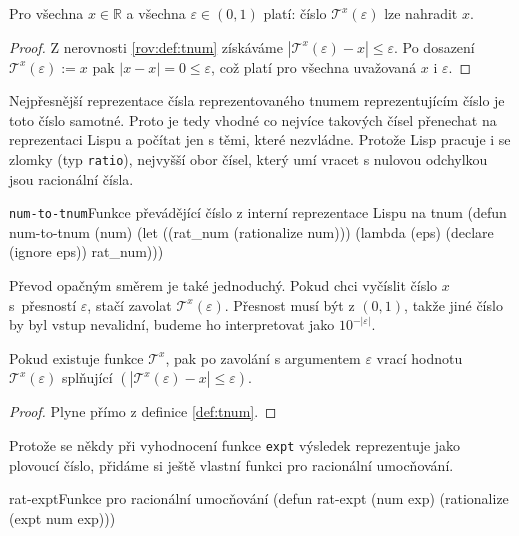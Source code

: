 \begin{lemma}\label{lem:num-to-tnum}
Pro všechna $x\in\mathbb{R}$ a všechna $\varepsilon \in (0,1)$ platí: číslo $\mathcal{T}^x(\varepsilon)$ lze nahradit $x$.
\begin{proof}
Z nerovnosti \ref{rov:def:tnum} získáváme $|\mathcal{T}^x(\varepsilon) - x |\leq \varepsilon$. Po dosazení $\mathcal{T}^x(\varepsilon) := x$ pak $|x - x | = 0 \leq \varepsilon$, což platí pro všechna uvažovaná $x$ i $\varepsilon$.
\end{proof}
\end{lemma}

Nejpřesnější reprezentace čísla reprezentovaného tnumem reprezentujícím čí\-slo je toto číslo samotné. Proto je tedy vhodné co nejvíce takových čísel přenechat na reprezentaci Lispu a počítat jen s těmi, které nezvládne. Protože Lisp pracuje i se zlomky (typ \texttt{ratio}), nejvyšší obor čísel, který umí vracet s nulovou odchylkou jsou racionální čísla.

\begin{lispcode}{\texttt{num-to-tnum}}{Funkce převádějící číslo z interní reprezentace Lispu na tnum}
(\textcolor{funkcionalni}{defun} \textcolor{pojmenovan}{num-to-tnum} (num)
  (\textcolor{vedlejsi}{let} ((rat_num (\textcolor{matematicke}{rationalize} num)))
    (\textcolor{funkcionalni}{lambda} (eps) (\textcolor{vedlejsi}{declare} (\textcolor{vedlejsi}{ignore} eps))
      rat_num)))
\end{lispcode}

Převod opačným směrem je také jednoduchý. Pokud chci vyčíslit číslo $x$ s~přesností $\varepsilon$, stačí zavolat $\mathcal{T}^x(\varepsilon)$. Přesnost musí být z $(0, 1)$, takže jiné číslo by byl vstup nevalidní, budeme ho interpretovat jako $10^{-|\varepsilon|}$.

\begin{lemma}
Pokud existuje funkce $\mathcal{T}^x$, pak po zavolání s argumentem $\varepsilon$ vrací hodnotu $\mathcal{T}^x(\varepsilon)$ splňující $(|\mathcal{T}^x(\varepsilon) - x |\leq \varepsilon)$.
\begin{proof}
Plyne přímo z definice \ref{def:tnum}.
\end{proof}
\end{lemma}

Protože se někdy při vyhodnocení funkce \texttt{expt} výsledek reprezentuje jako plovoucí číslo, přidáme si ještě vlastní funkci pro racionální umocňování.

\begin{lispcode}{rat-expt}{Funkce pro racionální umocňování}
(\textcolor{funkcionalni}{defun} \textcolor{pojmenovan}{rat-expt} (num exp)
  (\textcolor{matematicke}{rationalize} (\textcolor{matematicke}{expt} num exp)))
\end{lispcode}

